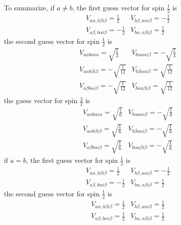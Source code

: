 \documentclass[bachelor, english]{ustcthesis}
\begin{document}
To summarize, if $a \neq b$, the first guess vector for spin $\frac{1}{2}$ is
\begin{equation}
	\begin{array}{ll}
		V_{a \alpha, b \beta i \beta}=\frac{1}{2} & V_{b \beta, a \alpha i \beta}=-\frac{1}{2} 
		\\
		V_{a \beta, b \alpha i \beta}=-\frac{1}{2} & V_{b \alpha, a \beta i \beta}=\frac{1}{2} 
	\end{array}
\end{equation}
the second guess vector for spin $\frac{1}{2}$ is 
\begin{equation}
	\begin{array}{ll}
		V_{a \alpha b \alpha i \alpha}=\sqrt{\frac{1}{3}} & V_{b \alpha a \alpha i \beta}=-\sqrt{\frac{1}{3}} 
		\\
		V_{a \alpha b \beta i \beta}=-\sqrt{\frac{1}{12}} & V_{b \beta a \alpha i \beta}=\sqrt{\frac{1}{12}} 
		\\
		V_{a \beta b \alpha i \beta}=-\sqrt{\frac{1}{12}} & V_{b \alpha a \beta i \beta}=\sqrt{\frac{1}{12}} 
	\end{array}
\end{equation}
the guess vector for spin $\frac{3}{2}$ is
\begin{equation}
	\begin{array}{ll}
		V_{a \alpha b \alpha i \alpha}=\sqrt{\frac{1}{6}} & V_{b \alpha a \alpha i \beta}=-\sqrt{\frac{1}{6}} 
		\\
		V_{a \alpha b \beta i \beta}=\sqrt{\frac{1}{6}} & V_{b \beta a \alpha i \beta}=-\sqrt{\frac{1}{6}} 
		\\
		V_{a \beta b \alpha i \beta}=\sqrt{\frac{1}{6}} & V_{b \alpha a \beta i \beta}=-\sqrt{\frac{1}{6}} 
	\end{array}
\end{equation}
if $a=b$, the first guess vector for spin $\frac{1}{2}$ is
\begin{equation}
	\begin{array}{ll}
		V_{a \alpha, b \beta i \beta}=\frac{1}{2} & V_{b \beta, a \alpha i \beta}=-\frac{1}{2} 
		\\
		V_{a \beta, b \alpha i \beta}=-\frac{1}{2} & V_{b \alpha, a \beta i \beta}=\frac{1}{2} 
	\end{array}
\end{equation}
the second guess vector for spin $\frac{1}{2}$ is 
\begin{equation}
	\begin{array}{ll}
		V_{a \alpha, b \beta i \beta}=\frac{1}{2} & V_{b \beta, a \alpha i \beta}=\frac{1}{2} 
		\\
		V_{a \beta, b \alpha i \beta}=\frac{1}{2} & V_{b \alpha, a \beta i \beta}=\frac{1}{2} 
	\end{array}
\end{equation}
\end{document}
